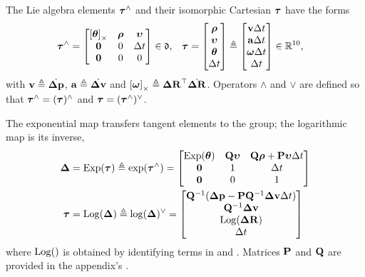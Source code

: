 The Lie algebra elements ${\bm \tau}^\wedge$ and their isomorphic Cartesian ${\bm \tau}$ have the forms
%
\begin{align}
    \label{equ:lie_algebra}
    {\bm \tau}^\wedge &= \begin{bmatrix}
    \left[{{\bm \theta}}\right]_\times & {\bm \rho} & {\bm \upsilon} \\
    \bf0 & 0 & \Delta t \\
    \bf0 & 0 & 0
    \end{bmatrix} \in \mathfrak{d}
    ,&
    {\bm \tau} &= \begin{bmatrix}
    {\bm \rho} \\ {\bm \upsilon} \\ {{\bm \theta}} \\ \Delta t
    \end{bmatrix}
    \triangleq \begin{bmatrix}
    {\bf v}\Delta t \\ {\bf a}\Delta t \\ {{\bm \omega}}\Delta t \\ \Delta t
    \end{bmatrix} 
    \in {\mathbb R}^{10}
    ,
\end{align}
%
with ${\bf v}\triangleq\dot{{\bm \Delta {\bf p}}}$, ${\bf a}\triangleq\dot{{\bm \Delta {\bf v}}}$ and $\left[{{\bm \omega}}\right]_\times\triangleq{\bm \Delta {\bf R}}^{\top}\dot{{\bm \Delta {\bf R}}}$.
Operators $\wedge$ and $\vee$ are defined so that ${\bm \tau}^\wedge=({\bm \tau})^\wedge$ and ${\bm \tau}=({\bm \tau}^\wedge)^\vee$.

The exponential map transfers tangent elements to the group; the logarithmic map is its inverse,
%
\begin{align}
    \D &= \Exp(\bftau) \te \exp(\bftau\hhat) = \begin{bmatrix}
    \Exp(\bth) & \bfQ\bfupsilon & \bfQ\bfrho+\bfP\bfupsilon\Dt \\
    \bf0 & 1 & \Dt \\
    \bf0 & 0 & 1
    \end{bmatrix} %
    \label{eq:compact_exp}
    \\
    \bftau &= \Log(\D) \te \log(\D)\vvee = \begin{bmatrix}
    \bfQ\inv(\Dp-\bfP\bfQ\inv\Dv\Dt) \\
    \bfQ\inv\Dv \\
    \Log(\DR) \\
    \Dt 
    \end{bmatrix} %
    \label{eq:compact_log}
\end{align}
%
where $\operatorname*{Log}()$ is obtained by identifying terms in  and .
Matrices ${\bf P}$ and ${\bf Q}$ are provided in the appendix's .

